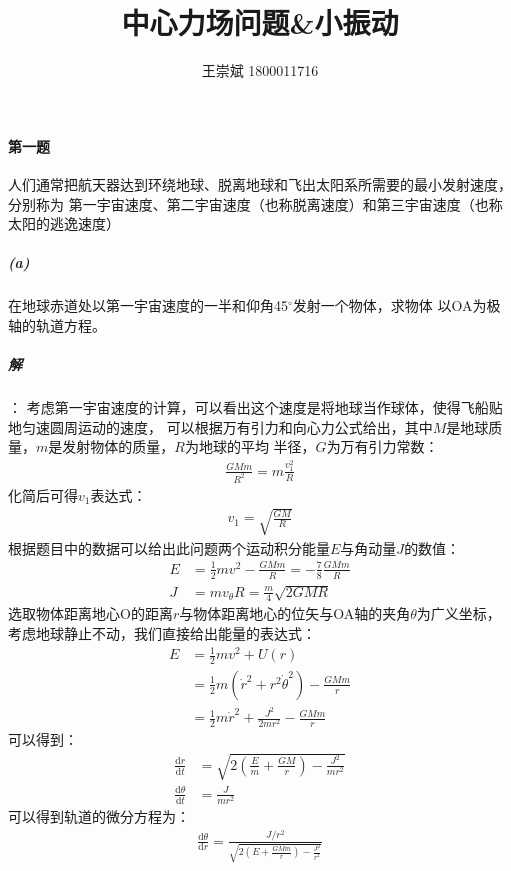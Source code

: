 \documentclass[a4paper]{ctexart}
\title{\textbf{中心力场问题\&小振动}}
\author{王崇斌 1800011716}
\date{}
\def\d{\mathrm{d}}
\def\degree{$^{\circ}$}
\begin{document}
    \pagestyle{fancy}
	\chead{}
	\rhead{}
	\maketitle
    \thispagestyle{fancy}
    \paragraph{第一题}
    人们通常把航天器达到环绕地球、脱离地球和飞出太阳系所需要的最小发射速度，分别称为
    第一宇宙速度、第二宇宙速度（也称脱离速度）和第三宇宙速度（也称太阳的逃逸速度）
    \subparagraph{(a)}\;在地球赤道处以第一宇宙速度的一半和仰角45\degree 发射一个物体，求物体
    以OA为极轴的轨道方程。
    \subparagraph{解}：
    考虑第一宇宙速度的计算，可以看出这个速度是将地球当作球体，使得飞船贴地匀速圆周运动的速度，
    可以根据万有引力和向心力公式给出，其中$M$是地球质量，$m$是发射物体的质量，$R$为地球的平均
    半径，$G$为万有引力常数：
    \begin{align}
        \frac{GMm}{R^{2}} = m \frac{v_{1}^{2}}{R}
    \end{align}
    化简后可得$v_{1}$表达式：
    \begin{align}
        v_{1} = \sqrt{\frac{GM}{R}}
    \end{align}
    根据题目中的数据可以给出此问题两个运动积分能量$E$与角动量$J$的数值：
    \begin{align}
        E &= \frac{1}{2}mv^{2} - \frac{GMm}{R} = -\frac{7}{8}\frac{GMm}{R}\\
        J &= mv_{\theta}R = \frac{m}{4}\sqrt{2GMR}
    \end{align}
    选取物体距离地心O的距离$r$与物体距离地心的位矢与OA轴的夹角$\theta$为广义坐标，
    考虑地球静止不动，我们直接给出能量的表达式：
    \begin{align}
        E & = \frac{1}{2}mv^{2} + U(r)\\
          & = \frac{1}{2}m(\dot{r}^{2} + r^{2}\dot{\theta}^{2}) - \frac{GMm}{r}\\
          & = \frac{1}{2}m\dot{r}^{2} + \frac{J^{2}}{2mr^{2}} - \frac{GMm}{r}
    \end{align}
    可以得到：
    \begin{align}
        \frac{\d r}{\d t} &= \sqrt{2\left(\frac{E}{m} + \frac{GM}{r}\right) - \frac{J^{2}}{mr^{2}}}\\
        \frac{\d \theta}{\d t} &= \frac{J}{mr^{2}}
    \end{align}
    可以得到轨道的微分方程为：
    \begin{align}
        \frac{\d \theta}{\d r} = \frac{J / r^{2}}{\sqrt{2\left(E + \frac{GMm}{r}\right) - \frac{J^{2}}{r^{2}}}}
    \end{align}
\end{document}
